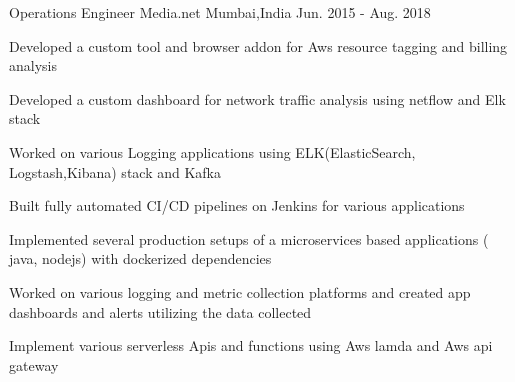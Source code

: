 \begin{cventries}
  \cventry
    {Operations Engineer} %
    {Media.net} %
    {Mumbai,India} %
    {Jun. 2015 - Aug. 2018} %
    {
      \begin{cvitems} %
	    \item {Developed a custom tool and browser addon for Aws resource tagging and billing analysis }
		\item {Developed a custom dashboard for network traffic analysis using netflow and Elk stack }
        \item {Worked on various Logging applications using ELK(ElasticSearch, Logstash,Kibana) stack and Kafka}
        \item {Built fully automated CI/CD pipelines on Jenkins for various applications}
        \item {Implemented several production setups of a microservices based applications ( java, nodejs) with dockerized dependencies}
        \item {Worked on various logging and metric collection platforms and created app dashboards and alerts utilizing the data collected}
		\item {Implement various serverless Apis and functions using Aws lamda and Aws api gateway}
      \end{cvitems}
    }

\end{cventries}

